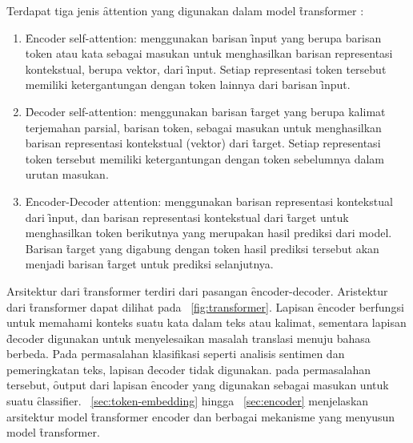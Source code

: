 	Terdapat tiga jenis \f{attention} yang digunakan dalam model \f{transformer} \citep{transformerori}:
	\begin{enumerate}
		\item \f{Encoder self-attention}: menggunakan barisan \f{input} yang berupa barisan token atau kata sebagai masukan untuk menghasilkan barisan representasi kontekstual, berupa vektor, dari \f{input}. Setiap representasi token tersebut memiliki ketergantungan dengan token lainnya dari barisan \f{input}.
		\item \f{Decoder self-attention}: menggunakan barisan \f{target} yang berupa kalimat terjemahan parsial, barisan token, sebagai masukan untuk menghasilkan barisan representasi kontekstual (vektor) dari \f{target}. Setiap representasi token tersebut memiliki ketergantungan dengan token sebelumnya dalam urutan masukan.
		\item \f{Encoder-Decoder attention}: menggunakan barisan representasi kontekstual dari \f{input}, dan barisan representasi kontekstual dari \f{target} untuk menghasilkan token berikutnya yang merupakan hasil prediksi dari model. Barisan \f{target} yang digabung dengan token hasil prediksi tersebut akan menjadi barisan \f{target} untuk prediksi selanjutnya.
	\end{enumerate}
	Arsitektur dari \f{transformer} terdiri dari pasangan \f{encoder-decoder}. Aristektur dari \f{transformer} dapat dilihat pada \pic~\ref{fig:transformer}. Lapisan \f{encoder} berfungsi untuk memahami konteks suatu kata dalam teks atau kalimat, sementara lapisan \f{decoder} digunakan untuk menyelesaikan masalah translasi menuju bahasa berbeda. Pada permasalahan klasifikasi seperti analisis sentimen dan pemeringkatan teks, lapisan \f{decoder} tidak digunakan. pada permasalahan tersebut, \f{output} dari lapisan \f{encoder} yang digunakan sebagai masukan untuk suatu \f{classifier}. \sect~\ref{sec:token-embedding} hingga \sect~\ref{sec:encoder} menjelaskan arsitektur model \f{transformer encoder} dan berbagai mekanisme yang menyusun model \f{transformer}.

